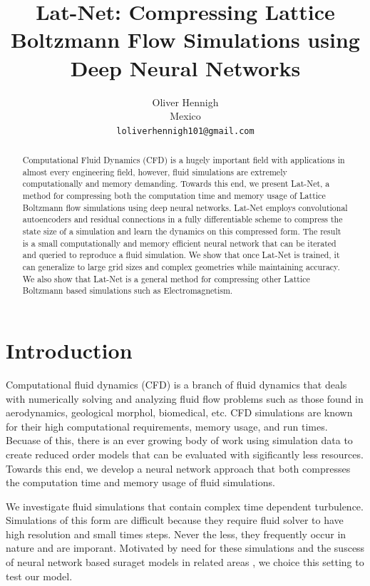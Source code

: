 \documentclass{article}
\title{Lat-Net: Compressing Lattice Boltzmann Flow Simulations using Deep Neural Networks}
\author{
  Oliver Hennigh \\
  Mexico \\
  \texttt{loliverhennigh101@gmail.com} \\
}
\begin{document}

\maketitle

\begin{abstract}
Computational Fluid Dynamics (CFD) is a hugely important field with applications in almost every engineering field, however, fluid simulations are extremely computationally and memory demanding. Towards this end, we present Lat-Net, a method for compressing both the computation time and memory usage of Lattice Boltzmann flow simulations using deep neural networks. Lat-Net employs convolutional autoencoders and residual connections in a fully differentiable scheme to compress the state size of a simulation and learn the dynamics on this compressed form. The result is a small computationally and memory efficient neural network that can be iterated and queried to reproduce a fluid simulation. We show that once Lat-Net is trained, it can generalize to large grid sizes and complex geometries while maintaining accuracy. We also show that Lat-Net is a general method for compressing other Lattice Boltzmann based simulations such as Electromagnetism.

\end{abstract}

\section{Introduction}

Computational fluid dynamics (CFD) is a branch of fluid dynamics that deals with numerically solving and analyzing fluid flow problems such as those found in aerodynamics, geological morphol, biomedical, etc. CFD simulations are known for their high computational requirements, memory usage, and run times. Becuase of this, there is an ever growing body of work using simulation data to create reduced order models that can be evaluated with sigificantly less resources. Towards this end, we develop a neural network approach that both compresses the computation time and memory usage of fluid simulations.

We investigate fluid simulations that contain complex time dependent turbulence. Simulations of this form are difficult because they require fluid solver to have high resolution and small times steps. Never the less, they frequently occur in nature and are imporant. Motivated by need for these simulations and the suscess of neural network based suraget models in related areas \cite{tompson2016accelerating} \cite{guo2016convolutional}, we choice this setting to test our model.
\end{document}
